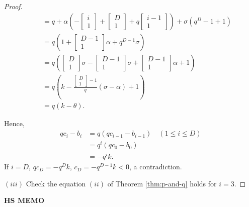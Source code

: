 \documentclass[
]{book}
\theoremstyle{definition}
\theoremstyle{definition}
\theoremstyle{definition}
\theoremstyle{definition}
\theoremstyle{remark}
\begin{document}
\begin{proof}
\begin{align}
& \quad = q+\alpha\left(-\begin{bmatrix}{i}\\{1}\end{bmatrix}+\begin{bmatrix}{D}\\{1}\end{bmatrix}+q\begin{bmatrix}{i-1}\\{1}\end{bmatrix}\right)+\sigma(q^D-1+1)\\
& \quad = q\left(1 + \begin{bmatrix}{D-1}\\{1}\end{bmatrix}\alpha + q^{D-1}\sigma\right)\\
& \quad = q\left(\begin{bmatrix}{D}\\{1}\end{bmatrix}\sigma - \begin{bmatrix}{D-1}\\{1}\end{bmatrix}\sigma + \begin{bmatrix}{D-1}\\{1}\end{bmatrix}\alpha + 1\right)\\
& \quad = q\left(k-\frac{\begin{bmatrix}{D}\\{1}\end{bmatrix}-1}{q}(\sigma-\alpha)+1\right)\\
& \quad = q(k-\theta).
\end{align}

Hence,
\begin{align}
qc_i - b_i & = q(qc_{i-1}-b_{i-1})\quad (1\leq i\leq D)\\
& = q^i(qc_0 - b_0)\\
& = -q^ik.
\end{align}
If \(i = D\), \(qc_D = -q^Dk\), \(c_D = -q^{D-1}k < 0\), a contradiction.

\((iii)\) Check the equation \((ii)\) of Theorem \ref{thm:p-and-q} holds for \(i=3\).

\end{proof}

\textbf{HS MEMO}
\end{document}
